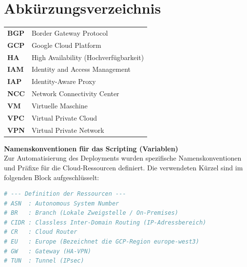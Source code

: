 \chapter*{Abkürzungsverzeichnis}

\begin{longtable}{p{3cm} p{12cm}}
\textbf{BGP}  & Border Gateway Protocol \\
\textbf{GCP}  & Google Cloud Platform \\
\textbf{HA}   & High Availability (Hochverfügbarkeit) \\
\textbf{IAM}  & Identity and Access Management \\
\textbf{IAP}  & Identity-Aware Proxy \\
\textbf{NCC}  & Network Connectivity Center \\
\textbf{VM}   & Virtuelle Maschine \\
\textbf{VPC}  & Virtual Private Cloud \\
\textbf{VPN}  & Virtual Private Network \\
\end{longtable}

\vspace{1cm}
\noindent\textbf{Namenskonventionen für das Scripting (Variablen)} \\
Zur Automatisierung des Deployments wurden spezifische Namenskonventionen und Präfixe für die Cloud-Ressourcen definiert. Die verwendeten Kürzel sind im folgenden Block aufgeschlüsselt:

\begin{lstlisting}[language=bash, caption={Ressourcen-Kürzel und Namenskonventionen}]
# --- Definition der Ressourcen ---
# ASN  : Autonomous System Number
# BR   : Branch (Lokale Zweigstelle / On-Premises)
# CIDR : Classless Inter-Domain Routing (IP-Adressbereich)
# CR   : Cloud Router
# EU   : Europe (Bezeichnet die GCP-Region europe-west3)
# GW   : Gateway (HA-VPN)
# TUN  : Tunnel (IPsec)
\end{lstlisting}